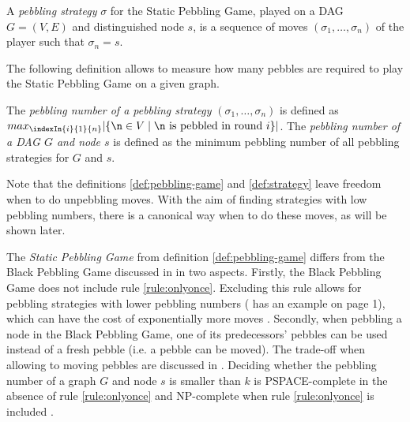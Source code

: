 \begin{definition}[Strategy]
\label{def:strategy}
A \emph{pebbling strategy} $\sigma$ for the Static Pebbling Game, played on a DAG $G = (V,E)$ and distinguished node $s$, is a sequence of moves $(\sigma_1,\ldots,\sigma_n)$ of the player such that $\sigma_n = s$.
\end{definition}

The following definition allows to measure how many pebbles are required to play the Static Pebbling Game on a given graph.

\begin{definition}
The \emph{pebbling number of a pebbling strategy} $(\sigma_1,\ldots,\sigma_n)$ is defined as 
$ max_{\indexIn{i}{1}{n}}|\{ \n \in V \mid \n \text{ is pebbled in round } i\}| $.
The \emph{pebbling number of a DAG $G$ and node $s$} is defined as the minimum pebbling number of all pebbling strategies for $G$ and $s$.
\end{definition}

Note that the definitions \ref{def:pebbling-game} and \ref{def:strategy} leave freedom when to do unpebbling moves.
With the aim of finding strategies with low pebbling numbers, there is a canonical way when to do these moves, as will be shown later.

\noindent
The \emph{Static Pebbling Game} from definition \ref{def:pebbling-game} differs from the Black Pebbling Game discussed in \cite{hertel2007black,pippenger1982advances} in two aspects. 
Firstly, the Black Pebbling Game does not include rule \ref{rule:onlyonce}. 
Excluding this rule allows for pebbling strategies with lower pebbling numbers (\cite{sethi1975complete} has an example on page 1), which can have the cost of exponentially more moves \cite{van1979move}.
Secondly, when pebbling a node in the Black Pebbling Game, one of its predecessors' pebbles can be used instead of a fresh pebble (i.e. a pebble can be moved). The trade-off when allowing to moving pebbles are discussed in \cite{van1979move}. Deciding whether the pebbling number of a graph $G$ and node $s$ is smaller than $k$ is PSPACE-complete in the absence of rule \ref{rule:onlyonce} \cite{gilbert1980pebbling} and NP-complete when rule \ref{rule:onlyonce} is included \cite{sethi1975complete}.

